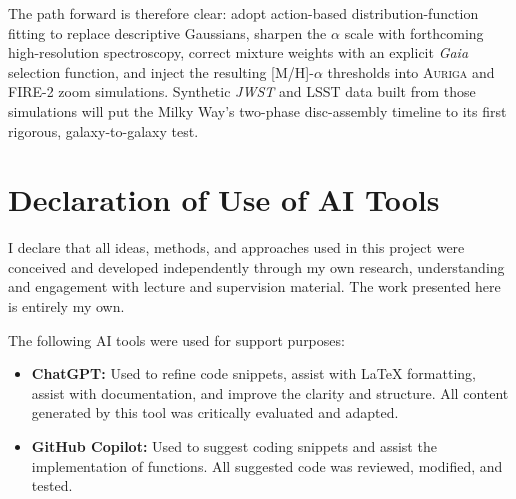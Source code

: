 \documentclass[a4paper,12pt]{article}
\begin{document}
The path forward is therefore clear: adopt action-based distribution-function fitting to
replace descriptive Gaussians, sharpen the $\alpha$ scale with forthcoming high-resolution
spectroscopy, correct mixture weights with an explicit \textit{Gaia} selection function,
and inject the resulting [M/H]-$\alpha$ thresholds into \textsc{Auriga} and
\textsc{FIRE-2} zoom simulations.  Synthetic \textit{JWST} and LSST data built from those
simulations will put the Milky Way's two-phase disc-assembly timeline to its first
rigorous, galaxy-to-galaxy test.









\newpage



\section*{Declaration of Use of AI Tools}

I declare that all ideas, methods, and approaches used in this project were 
conceived and developed independently through my own research, understanding 
and engagement with lecture and supervision material. The work presented here 
is entirely my own.

The following AI tools were used for support purposes:
\begin{itemize}
    \item \textbf{ChatGPT:} Used to refine code snippets, assist with LaTeX 
    formatting, assist with documentation, and improve the clarity and structure. 
    All content generated by this tool was critically evaluated and adapted.
    \item \textbf{GitHub Copilot:} Used to suggest coding snippets and assist 
    the implementation of functions. All suggested code was reviewed, modified, 
    and tested.
\end{itemize}
\end{document}
